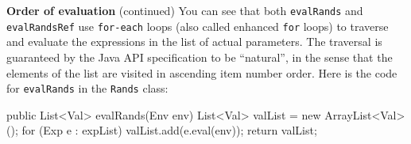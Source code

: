 \begin{minipage}[t]{\sw}
\slidenumber
\LARGE
{\bf Order of evaluation} (continued)\exx
You can see that both \verb'evalRands' and \verb'evalRandsRef'
use \verb'for-each' loops (also called enhanced \verb'for' loops)
to traverse and evaluate the expressions in the list of actual parameters.
The traversal is guaranteed by the Java API specification to be ``natural'',
in the sense that the elements of the list
are visited in ascending item number order.
Here is the code for \verb'evalRands' in the \verb'Rands' class:
\begin{qv}
public List<Val> evalRands(Env env) {
    List<Val> valList = new ArrayList<Val>();
    for (Exp e : expList)
        valList.add(e.eval(env));
    return valList;
}
\end{qv}
\end{minipage}
